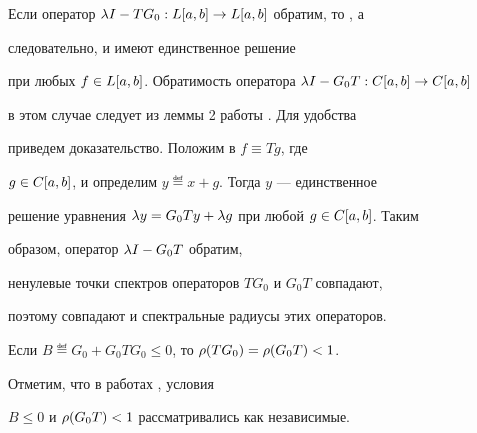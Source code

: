 \begin{pf}
Если оператор $\lambda I-TG_0:L[a,b]\to L[a,b]$ обратим, то , а


следовательно,  и  имеют единственное решение


при любых $f\in L[a,b]$. Обратимость оператора $\lambda I-G_0T:C[a,b]\to C[a,b]$


в этом случае следует из леммы 2 работы \cite{MR}. Для удобства


приведем доказательство. Положим в  $f\equiv Tg$, где


$g\in C[a,b]$, и определим $y\eqdef x+g$. Тогда $y$ --- единственное


решение уравнения $\lambda y= G_0Ty+\lambda g$ при любой $g\in C[a,b]$. Таким


образом, оператор $\lambda I-G_0T$ обратим,


ненулевые точки спектров операторов $TG_0$ и $G_0T$ совпадают,


поэтому совпадают и спектральные радиусы этих операторов.


\end{pf}








\begin{lem}\label{l2}


Если $B\eqdef G_0+G_0TG_0\le0$, то $\rho(TG_0)=\rho(G_0T)<1$.


\end{lem}





Отметим, что в работах \cite{Kob}, \cite{Lih} условия


$B\le0$ и $\rho(G_0T)<1$ рассматривались как независимые.





